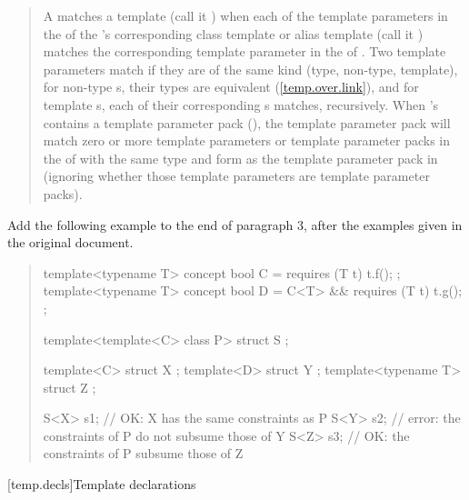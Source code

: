 \begin{quote}
\setcounter{Paras}{2}
\pnum
A  matches  a template 
  (call it ) when each of the 
template parameters in the  of the 
's corresponding class template or alias 
template (call it  ) matches the corresponding template parameter in 
the  of .
% 
Two template parameters match if they are of the same kind (type, non-type, 
template), for non-type s, their types are 
equivalent (\ref{temp.over.link}), and for template 
s, each of their corresponding
s matches, recursively. 
% 
When ’s  
contains a template parameter pack (), the template 
parameter pack will match zero or more template parameters or template 
parameter packs in the  of
 with the same type and form as the template parameter
pack in  (ignoring whether those template parameters are 
template parameter packs).
\end{quote}

Add the following example to the end of paragraph 3, after the
examples given in the original document.

\begin{quote}
\begin{addedblock}
\enterexample
\begin{codeblock}
template<typename T> concept bool C = requires (T t) { t.f(); };
template<typename T> concept bool D = C<T> && requires (T t) { t.g(); };

template<template<C> class P>
  struct S { };

template<C> struct X { };
template<D> struct Y { };
template<typename T> struct Z { };

S<X> s1; // OK: X has the same constraints as P
S<Y> s2; // error: the constraints of P do not subsume those of Y
S<Z> s3; // OK: the constraints of P subsume those of Z
\end{codeblock}
\exitexample
\end{addedblock}
\end{quote}


\setcounter{section}{5}
[temp.decls]{Template declarations}

